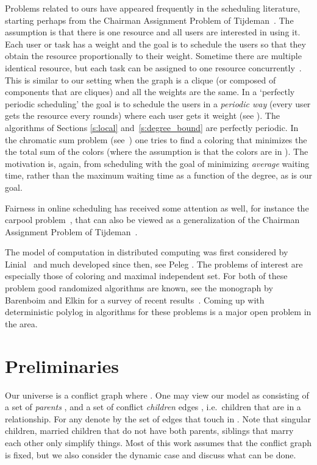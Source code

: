 \documentclass[11pt]{article}
\begin{document}
Problems related to ours have appeared frequently in the scheduling literature, starting perhaps from the Chairman Assignment Problem of Tijdeman~\cite{Tijdeman1980}. The assumption is that there is one resource and all users are interested in using it. Each user or task has a weight and the goal is to schedule the users so that they obtain the resource proportionally to their weight.  Sometime there are multiple identical resource, but each task can be assigned to one resource concurrently~\cite{BaruahCPV93,LitmanMS11}. This is similar to our setting when the graph is a clique (or composed of components that are cliques) and all the weights are the same.
In a `perfectly periodic scheduling' the goal is to schedule the users in a {\em periodic way} (every user  gets the resource every  rounds)  where each user gets it weight (see \cite{Bar-NoyNP02}). The algorithms of Sections \ref{s:local} and~\ref{s:degree_bound} are perfectly periodic.
In the chromatic sum problem (see~\cite{Bar-NoyBHST98}) one tries to find a coloring that minimizes the the total sum of the colors (where the assumption is that the colors are in ). The motivation is, again, from scheduling with the goal of minimizing {\em average} waiting time, rather than the maximum waiting time as a function of the degree, as is our goal.

Fairness in online scheduling has received some attention as well, for instance the carpool problem~\cite{FaginW83,AjtaiANRSW98,Naor2005}, that can also be viewed as a generalization of the Chairman Assignment Problem of Tijdeman~\cite{Tijdeman1980}.

The  model of computation in distributed computing was first considered by Linial~\cite{Linial92} and much developed since then, see  Peleg \cite{Peleg00}. The problems of interest  are especially those of coloring and maximal independent set. For both of these problem good randomized algorithms are known, see the monograph by Barenboim and Elkin for a survey of recent results~\cite{BarenboimE13}. Coming up with deterministic polylog in  algorithms for these problems is a major open problem in the area.


\section{Preliminaries}\label{s:p}



Our universe is a conflict graph  where . One may view our model as consisting of a set of {\em
parents} , and a set of conflict {\em children} edges , i.e.\ children that are in a relationship.
For any  denote by  the set of edges that touch  in .
Note that singular children,  married children that do not have both parents, siblings that marry each other  only simplify things.
Most of this work assumes that the conflict graph is fixed, but we also consider the dynamic case and discuss what can be done.
\end{document}
